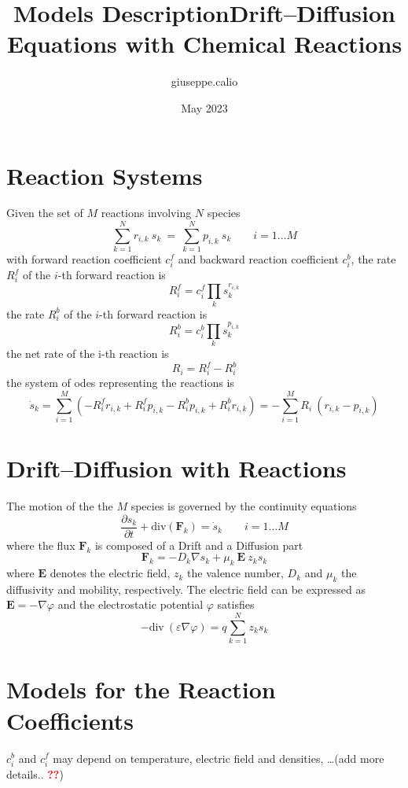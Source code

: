 \documentclass[11pt]{amsart}
\title{Models Description}
\author{giuseppe.calio }
\date{May 2023}
\title{Drift--Diffusion Equations with Chemical Reactions}
\begin{document}
\maketitle

\section{Reaction Systems}

Given the set of $M$ reactions involving $N$ species
\[
\sum_{k=1}^{N} r_{i,k}\ s_k\ =\ \sum_{k=1}^{N} p_{i,k}\ s_k \qquad  i=1\ldots M
\]
with forward reaction coefficient $c^f_i$ and backward reaction coefficient $c^b_i$,
the rate $R^{f}_i$ of the $i$-th forward reaction is 
$$
 R^{f}_i = c^{f}_i \prod_k s_k^{ r_{i,k} }
$$
the rate $R^{b}_i$ of the $i$-th forward reaction is 
$$
 R^{b}_i = c^{b}_i \prod_k s_k^{ p_{i,k} }
$$
the net rate of the i-th reaction is 
$$
R_i = R^{f}_i - R^{b}_i
$$
the system of odes representing the reactions is
$$
\dot{s}_k = \sum_{i=1}^M \left( - R^{f}_i r_{i,k} + R^{f}_i p_{i,k}
             - R^{b}_i p_{i,k} + R^{b}_i r_{i,k} \right) =
             - \sum_{i=1}^M  R_i\ (r_{i,k} - p_{i,k}) 
$$

\section{Drift--Diffusion with Reactions}

The motion of the the $M$ species is governed by the continuity equations
$$
\dfrac{\partial s_{k}}{\partial t} + \mathrm{div} \left( \mathbf{F}_{k} \right) = \dot{s}_k  \qquad  i=1\ldots M
$$
where the flux $\mathbf{F}_{k}$ is composed of a Drift and a Diffusion part
$$
\mathbf{F}_{k} = - D_{k} \nabla s_{k} + \mu_{k}\ \mathbf{E}\ z_{k} s_{k}
$$
where $\mathbf{E}$ denotes the electric field, $z_{k}$ the valence number, $D_{k}$ and $\mu_{k}$ 
the diffusivity and mobility, respectively.
The electric field can be expressed as $\mathbf{E} = - \nabla \varphi$ and the electrostatic potential $\varphi$ 
satisfies
$$
-\mathrm{div}\ \left( \varepsilon \nabla \varphi \right) = q \sum_{k=1}^{N} z_{k} s_{k}
$$

\section{Models for the Reaction Coefficients}

$c^{b}_i$ and $c^{f}_i$ may depend on temperature, electric field and densities, \dots(add more details.. \textcolor{red}{\textbf{??}})
\end{document}
